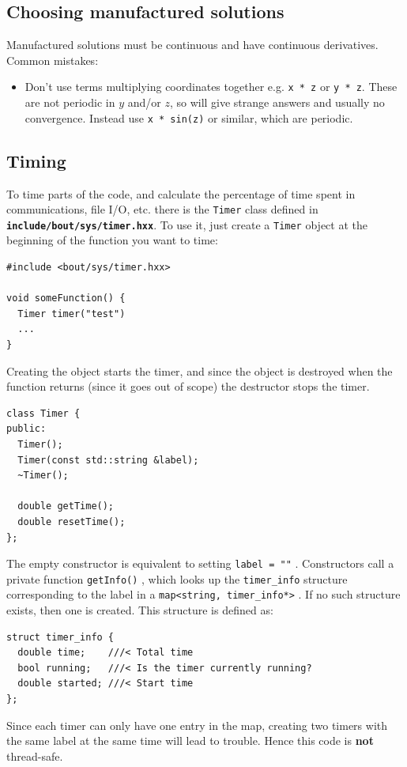 \documentclass[12pt]{article}
\newcommand{\file}[1]{\texttt{\bf #1}}
\begin{document}
\subsection{Choosing manufactured solutions}
%
Manufactured solutions must be continuous and have continuous derivatives.
Common mistakes:
%
\begin{itemize}
\item Don't use terms multiplying coordinates together e.g. \texttt{x * z} or
    \texttt{y * z}. These are not periodic in $y$ and/or $z$, so will give
    strange answers and usually no convergence. Instead use \texttt{x * sin(z)}
    or similar, which are periodic.
\end{itemize}
%



\subsection{Timing}
%
\label{sec:timerclass}
%
%
To time parts of the code, and calculate the percentage of time spent in
communications, file I/O, etc. there is the
%
\lstinline!Timer!
%
 class defined in \file{include/bout/sys/timer.hxx}. To use it, just create a
%
\lstinline!Timer!
%
object at the beginning of the function you want to time:
%
\begin{lstlisting}
#include <bout/sys/timer.hxx>

void someFunction() {
  Timer timer("test")
  ...
}
\end{lstlisting}
%
Creating the object starts the timer, and since the object is destroyed when
the function returns (since it goes out of scope) the destructor stops the
timer.
%
\begin{lstlisting}
class Timer {
public:
  Timer();
  Timer(const std::string &label);
  ~Timer();

  double getTime();
  double resetTime();
};
\end{lstlisting}
%
The empty constructor is equivalent to setting
%
\lstinline!label = ""!
%
.  Constructors call a private function
%
\lstinline!getInfo()!
%
, which looks up the
%
\lstinline!timer_info!
%
 structure corresponding to the label in a
%
\lstinline!map<string, timer_info*>!
%
. If no such structure exists, then one is created. This structure is defined
as:
%
\begin{lstlisting}
struct timer_info {
  double time;    ///< Total time
  bool running;   ///< Is the timer currently running?
  double started; ///< Start time
};
\end{lstlisting}
%
Since each timer can only have one entry in the map, creating two timers with
the same label at the same time will lead to trouble.  Hence this code is {\bf
not} thread-safe.
\end{document}
